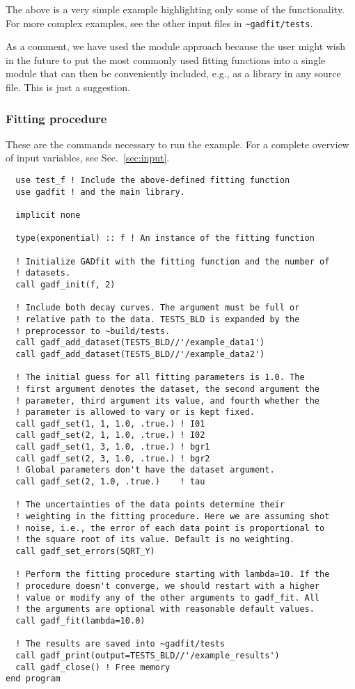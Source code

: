 \documentclass{article}
\begin{document}
The above is a very simple example highlighting only some of the
functionality. For more complex examples, see the other input files in
\verb+~gadfit/tests+.

As a comment, we have used the module approach because the user might
wish in the future to put the most commonly used fitting functions
into a single module that can then be conveniently included, e.g., as
a library in any source file. This is just a suggestion.

\subsubsection{Fitting procedure}

These are the commands necessary to run the example. For a complete
overview of input variables, see Sec.~\ref{sec:input}.
\begin{verbatim}
  use test_f ! Include the above-defined fitting function
  use gadfit ! and the main library.
  
  implicit none

  type(exponential) :: f ! An instance of the fitting function

  ! Initialize GADfit with the fitting function and the number of
  ! datasets.
  call gadf_init(f, 2)

  ! Include both decay curves. The argument must be full or
  ! relative path to the data. TESTS_BLD is expanded by the
  ! preprocessor to ~build/tests.
  call gadf_add_dataset(TESTS_BLD//'/example_data1')
  call gadf_add_dataset(TESTS_BLD//'/example_data2')

  ! The initial guess for all fitting parameters is 1.0. The
  ! first argument denotes the dataset, the second argument the
  ! parameter, third argument its value, and fourth whether the
  ! parameter is allowed to vary or is kept fixed.
  call gadf_set(1, 1, 1.0, .true.) ! I01
  call gadf_set(2, 1, 1.0, .true.) ! I02
  call gadf_set(1, 3, 1.0, .true.) ! bgr1
  call gadf_set(2, 3, 1.0, .true.) ! bgr2
  ! Global parameters don't have the dataset argument.
  call gadf_set(2, 1.0, .true.)    ! tau

  ! The uncertainties of the data points determine their
  ! weighting in the fitting procedure. Here we are assuming shot
  ! noise, i.e., the error of each data point is proportional to
  ! the square root of its value. Default is no weighting.
  call gadf_set_errors(SQRT_Y)

  ! Perform the fitting procedure starting with lambda=10. If the
  ! procedure doesn't converge, we should restart with a higher
  ! value or modify any of the other arguments to gadf_fit. All
  ! the arguments are optional with reasonable default values.
  call gadf_fit(lambda=10.0)

  ! The results are saved into ~gadfit/tests
  call gadf_print(output=TESTS_BLD//'/example_results')
  call gadf_close() ! Free memory
end program
\end{verbatim}
\end{document}
